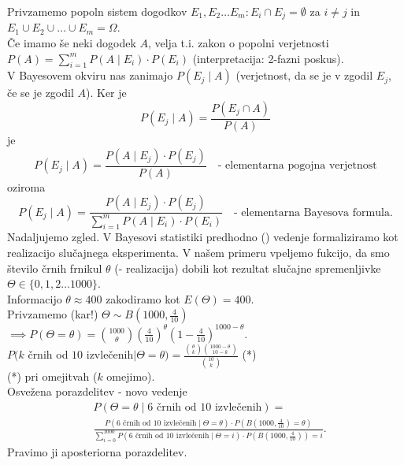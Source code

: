 \documentclass[a4paper, 12pt]{book}
\theoremstyle{definition}
\theoremstyle{remark}
\begin{document}
Privzamemo popoln sistem dogodkov $E_1, E_2 \dots E_m: E_i \cap E_j = \emptyset$ za $i \neq j$ in
$E_1 \cup E_2 \cup \dots \cup E_m = \Omega$. \\
Če imamo še neki dogodek $A$, velja t.i. zakon o popolni verjetnosti \\
$P(A) = \sum_{i=1}^{m} P(A \mid E_i) \cdot P(E_i)$ (interpretacija: 2-fazni poskus). \\
V Bayesovem okviru nas zanimajo $P(E_j \mid A)$ (verjetnost, da se je v  zgodil $E_j$,
če se je  zgodil $A$).
Ker je
\begin{equation*}
  P(E_j \mid A) = \frac{P(E_j \cap A)}{P(A)}
\end{equation*}
je
\begin{equation*}
  P(E_j \mid A) = \frac{P(A \mid E_j) \cdot P(E_j)}{P(A)} \quad \text{- elementarna pogojna verjetnost}
\end{equation*}
oziroma
\begin{equation*}
  P(E_j \mid A) = \frac{P(A \mid E_j) \cdot P(E_j)}{\sum_{i=1}^{m} P(A \mid E_i) \cdot P(E_i)}
    \quad \text{- elementarna Bayesova formula.}
\end{equation*}
Nadaljujemo zgled. V Bayesovi statistiki predhodno () vedenje formaliziramo kot realizacijo slučajnega eksperimenta.
V našem primeru vpeljemo fukcijo, da smo število črnih frnikul $\theta$ (- realizacija) dobili kot rezultat
slučajne spremenljivke $\Theta \in \{0, 1, 2 \dots 1000\}$. \\
Informacijo $\theta \approx 400$ zakodiramo kot $E(\Theta) = 400$. \\
Privzamemo (kar!) $\Theta \sim B\left(1000, \frac{4}{10}\right)$ \\
$\implies P(\Theta = \theta) = \binom{1000}{\theta} \left(\frac{4}{10}\right)^{\theta} \left(1-\frac{4}{10}\right)^{1000-\theta}$. \\
$P(k$ črnih od $10$ izvlečenih$ \mid \Theta = \theta) = \frac{\binom{\theta}{k} \binom{1000-\theta}{10-k}}{\binom{10}{k}}$ (*) \\
(*) pri omejitvah ($k$ omejimo). \\
Osvežena porazdelitev - novo vedenje \\
\begin{align*}
  &P(\Theta = \theta \mid 6 \text{ črnih od } 10 \text{ izvlečenih}) = \\
  &\frac{P(6 \text{ črnih od } 10 \text{ izvlečenih} \mid \Theta = \theta) \cdot P(B(1000, \frac{4}{10}) = \theta)}
    {\sum_{i=0}^{1000} P(6 \text{ črnih od } 10 \text{ izvlečenih} \mid \Theta = i) \cdot P(B(1000, \frac{4}{10})) = i}.
\end{align*}
Pravimo ji aposteriorna porazdelitev.
\end{document}
